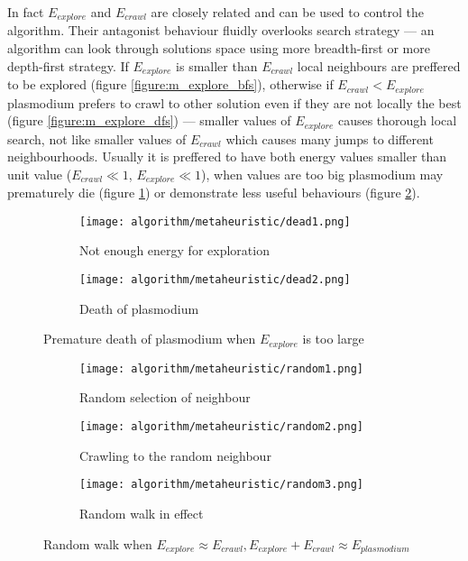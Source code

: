 In fact $E_{explore}$ and $E_{crawl}$ are closely related and can be used to control the algorithm. Their antagonist behaviour fluidly overlooks search strategy --- an algorithm can look through solutions space using more breadth-first or more depth-first strategy. If $E_{explore}$ is smaller than $E_{crawl}$ local neighbours are preffered to be explored (figure \ref{figure:m_explore_bfs}), otherwise if $E_{crawl} < E_{explore}$ plasmodium prefers to crawl to other solution even if they are not locally the best (figure \ref{figure:m_explore_dfs}) --- smaller values of $E_{explore}$ causes thorough local search, not like smaller values of $E_{crawl}$ which causes many jumps to different neighbourhoods. Usually it is preffered to have both energy values smaller than unit value ($E_{crawl} \ll 1$, $E_{explore} \ll 1$), when values are too big plasmodium may prematurely die (figure \ref{figure:m_explore_dead}) or demonstrate less useful behaviours (figure \ref{figure:m_explore_special}).

\begin{figure}
  \centering

  \begin{subfigure}{0.3\textwidth}
    \centering
    \texttt{[image: algorithm/metaheuristic/dead1.png]}
    \caption{Not enough energy for exploration}
  \end{subfigure}
  \begin{subfigure}{0.3\textwidth}
    \centering
    \texttt{[image: algorithm/metaheuristic/dead2.png]}
    \caption{Death of plasmodium}
  \end{subfigure}

  \caption{Premature death of plasmodium when $E_{explore}$ is too large}
  \label{figure:m_explore_dead}
\end{figure}

\begin{figure}
  \centering

  \begin{subfigure}{0.3\textwidth}
    \centering
    \texttt{[image: algorithm/metaheuristic/random1.png]}
    \caption{Random selection of neighbour}
  \end{subfigure}
  \begin{subfigure}{0.3\textwidth}
    \centering
    \texttt{[image: algorithm/metaheuristic/random2.png]}
    \caption{Crawling to the random neighbour}
  \end{subfigure}
  \begin{subfigure}{0.3\textwidth}
    \centering
    \texttt{[image: algorithm/metaheuristic/random3.png]}
    \caption{Random walk in effect}
  \end{subfigure}

  \caption{Random walk when $E_{explore} \approx E_{crawl}, E_{explore} + E_{crawl} \approx E_{plasmodium}$}
  \label{figure:m_explore_special}
\end{figure}

